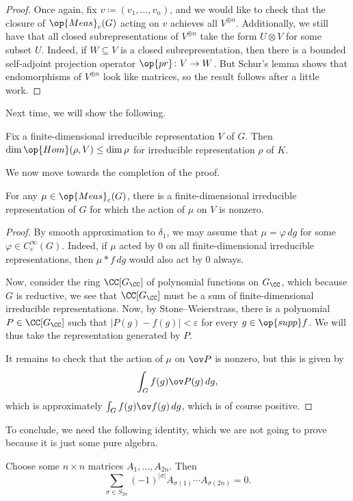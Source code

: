 \documentclass[../notes.tex]{subfiles}
\begin{document}
\begin{proof}
	Once again, fix $v\coloneqq(v_1,\ldots,v_n)$, and we would like to check that the closure of $\op{Meas}_c(G)$ acting on $v$ achieves all $V^{\oplus n}$. Additionally, we still have that all closed subrepresentations of $V^{\oplus n}$ take the form $U\otimes V$ for some subset $U$. Indeed, if $W\subseteq V$ is a closed subrepresentation, then there is a bounded self-adjoint projection operator $\op{pr}\colon V\to W$. But Schur's lemma shows that endomorphisms of $V^{\oplus n}$ look like matrices, so the result follows after a little work.
\end{proof}
Next time, we will show the following.
\begin{proposition} \label{prop:fd-dim-bound}
	Fix a finite-dimensional irreducible representation $V$ of $G$. Then $\dim\op{Hom}(\rho,V)\le\dim\rho$ for irreducible representation $\rho$ of $K$.
\end{proposition}
We now move towards the completion of the proof.
\begin{lemma} \label{lem:approx-to-nonzero-action}
	For any $\mu\in\op{Meas}_c(G)$, there is a finite-dimensional irreducible representation of $G$ for which the action of $\mu$ on $V$ is nonzero.
\end{lemma}
\begin{proof}
	By smooth approximation to $\delta_1$, we may assume that $\mu=\varphi\,dg$ for some $\varphi\in C_c^\infty(G)$. Indeed, if $\mu$ acted by $0$ on all finite-dimensional irreducible representations, then $\mu*f\,dg$ would also act by $0$ always.\todo{}

	Now, consider the ring $\CC[G_\CC]$ of polynomial functions on $G_\CC$, which because $G$ is reductive, we see that $\CC[G_\CC]$ must be a sum of finite-dimensional irreducible representations. Now, by Stone--Weierstrass, there is a polynomial $P\in\CC[G_\CC]$ such that $\left|P(g)-f(g)\right|<\varepsilon$ for every $g\in\op{supp}f$. We will thus take the representation generated by $P$.

	It remains to check that the action of $\mu$ on $\ov P$ is nonzero, but this is given by
	\[\int_G f(g)\ov P(g)\,dg,\]
	which is approximately $\int_Gf(g)\ov f(g)\,dg$, which is of course positive.
\end{proof}
To conclude, we need the following identity, which we are not going to prove because it is just some pure algebra.
\begin{theorem} \label{thm:alk-id}
	Choose some $n\times n$ matrices $A_1,\ldots,A_{2n}$. Then
	\[\sum_{\sigma\in S_{2n}}(-1)^{\left|\sigma\right|}A_{\sigma(1)}\cdots A_{\sigma(2n)}=0.\]
\end{theorem}
\end{document}
